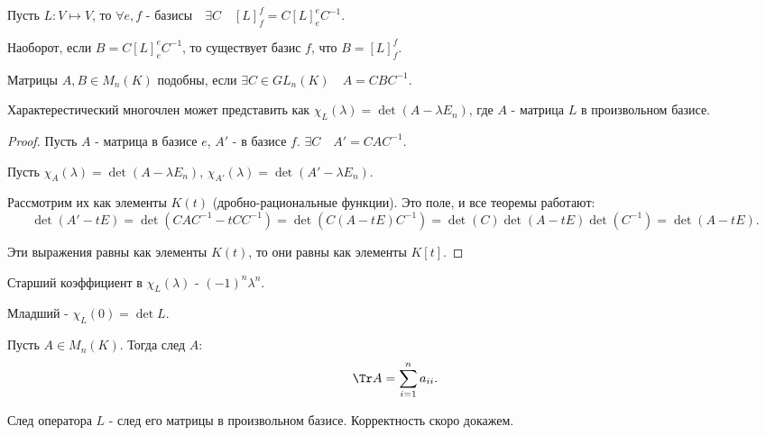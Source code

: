 \begin{statement} \thmslashn

    Пусть $L : V \mapsto V$, то $\forall{e, f \text{ - базисы}}\quad \exists{C}\quad [L]_{f}^{f}  = C[L]_{e}^{e}C^{-1}$.

    Наоборот, если $B = C[L]_{e}^{e}C^{-1}$, то существует базис $f$, что $B = [L]_{f}^{f}$.
\end{statement}


\begin{definition} \thmslashn 

    Матрицы $A, B\in M_{n}(K)$ подобны, если $\exists{C\in GL_{n}(K)}\quad A = CBC^{-1}$.
\end{definition}
\begin{statement} \thmslashn

    Характерестический многочлен может представить как $\chi_{L}(\lambda) = \det(A - \lambda E_{n})$, где $A$ - матрица $L$ в произвольном базисе.
    \begin{proof} \thmslashn
    
        Пусть $A$ - матрица в базисе $e$, $A'$ - в базисе $f$. $\exists{C}\quad A' = CAC^{-1}$.

        Пусть $\chi_{A}(\lambda) = \det(A - \lambda E_{n})$, $\chi_{A'}(\lambda) = \det(A' - \lambda E_{n})$.

        Рассмотрим их как элементы $K(t)$ (дробно-рациональные функции). Это поле, и все теоремы работают:
        \[ \det(A' - tE) = \det(CAC^{-1} - tCC^{-1}) = \det(C(A-tE)C^{-1}) = \det(C)\det(A-tE)\det (C^{-1}) = \det(A-tE) .\]

        Эти выражения равны как элементы $K(t)$, то они равны как элементы $K[t]$.
    \end{proof}
\end{statement}
\begin{statement} \thmslashn

    Старший коэффициент в $\chi_{L}(\lambda)$ - $(-1)^{n}\lambda^{n}$.

    Младший - $\chi_{L}(0) = \det L$.
\end{statement}
\begin{definition} \thmslashn 

    Пусть $A\in M_{n}(K)$. Тогда след $A$:
    \[ \Tr A = \sum\limits_{i=1}^{n} a_{ii} .\]

    След оператора $L$ - след его матрицы в произвольном базисе. Корректность скоро докажем.
\end{definition}

